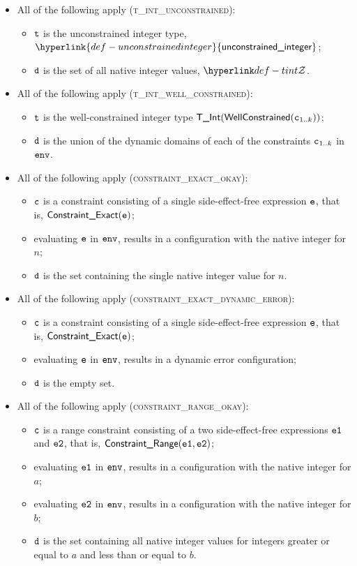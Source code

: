 \documentclass{book}
\newcommand\unconstrainedinteger[0]{\hyperlink{def-unconstrainedinteger}{\textsf{unconstrained\_integer}}}
\begin{document}
\begin{itemize}
  \item All of the following apply (\textsc{t\_int\_unconstrained}):
  \begin{itemize}
    \item $\texttt{t}$ is the unconstrained integer type, $\unconstrainedinteger$;
    \item $\texttt{d}$ is the set of all native integer values, $\tint$.
  \end{itemize}

  \item All of the following apply (\textsc{t\_int\_well\_constrained}):
  \begin{itemize}
    \item $\texttt{t}$ is the well-constrained integer type $\textsf{T\_Int}(\textsf{WellConstrained}(\texttt{c}_{1..k}))$;
    \item $\texttt{d}$ is the union of the dynamic domains of each of the constraints $\texttt{c}_{1..k}$ in $\texttt{env}$.
  \end{itemize}

  \item All of the following apply (\textsc{constraint\_exact\_okay}):
  \begin{itemize}
    \item $\texttt{c}$ is a constraint consisting of a single side-effect-free expression $\texttt{e}$, that is, $\textsf{Constraint\_Exact}(\texttt{e})$;
    \item evaluating $\texttt{e}$ in $\texttt{env}$, results in a configuration with the native integer for $n$;
    \item $\texttt{d}$ is the set containing the single native integer value for $n$.
  \end{itemize}

  \item All of the following apply (\textsc{constraint\_exact\_dynamic\_error}):
  \begin{itemize}
    \item $\texttt{c}$ is a constraint consisting of a single side-effect-free expression $\texttt{e}$, that is, $\textsf{Constraint\_Exact}(\texttt{e})$;
    \item evaluating $\texttt{e}$ in $\texttt{env}$, results in a dynamic error configuration;
    \item $\texttt{d}$ is the empty set.
  \end{itemize}

  \item All of the following apply (\textsc{constraint\_range\_okay}):
  \begin{itemize}
    \item $\texttt{c}$ is a range constraint consisting of a two side-effect-free expressions $\texttt{e1}$ and $\texttt{e2}$, that is, $\textsf{Constraint\_Range}(\texttt{e1}, \texttt{e2})$;
    \item evaluating $\texttt{e1}$ in $\texttt{env}$, results in a configuration with the native integer for $a$;
    \item evaluating $\texttt{e2}$ in $\texttt{env}$, results in a configuration with the native integer for $b$;
    \item $\texttt{d}$ is the set containing all native integer values for integers greater or equal to $a$ and less than or equal to $b$.
  \end{itemize}


\end{itemize}
\end{document}
